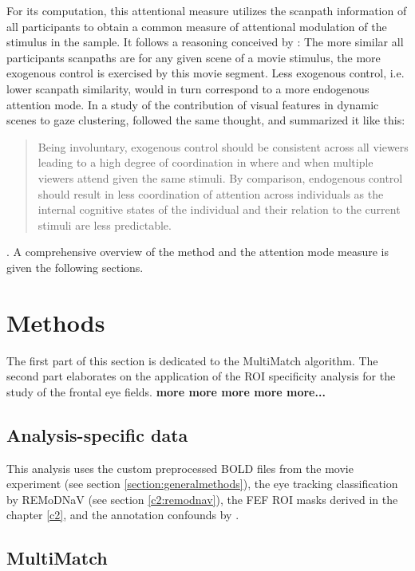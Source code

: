 \documentclass[a4paper, 12pt]{scrreprt}
\begin{document}
For its computation, this attentional measure utilizes the scanpath information of all participants to obtain a common measure of attentional modulation of the stimulus in the sample. It follows a reasoning conceived by \textcite{baumgartner}: The more similar all participants scanpaths are for any given scene of a movie stimulus, the more exogenous control is exercised by this movie segment. Less exogenous control, i.e. lower scanpath similarity, would in turn correspond to a more endogenous attention mode. In a study of the contribution of visual features in dynamic scenes to gaze clustering, \textcite{mital2011} followed the same thought, and summarized it like this:
\begin{quotation}
	Being involuntary, exogenous control
	should be consistent across all viewers leading to a high
	degree of coordination in where and when multiple viewers
	attend given the same stimuli. By comparison, endogenous
	control should result in less coordination of attention across
	individuals as the internal cognitive states of the individual
	and their relation to the current stimuli are less predictable.
\end{quotation}.
A comprehensive overview of the method and the attention mode measure is given the following sections.
 
\section{Methods}
The first part of this section is dedicated to the MultiMatch algorithm. The second part elaborates on the application of the ROI specificity analysis for the study of the frontal eye fields.
\textbf{more more more more more...}
\subsection{Analysis-specific data}

This analysis uses the custom preprocessed BOLD files from the movie experiment (see section \ref{section:generalmethods}), the eye tracking classification by REMoDNaV (see section \ref{c2:remodnav}), the FEF ROI masks derived in the chapter \ref{c2}, and the annotation confounds by \textcite{hausler2016annotation}.

\subsection{MultiMatch}\label{section:multimatch}
\end{document}
